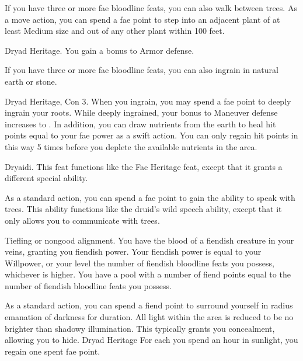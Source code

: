 If you have three or more fae bloodline feats, you can also walk between trees. As a move action, you can spend a fae point to step into an adjacent plant of at least Medium size and out of any other plant within 100 feet.

\featpre Dryad Heritage.
\featben You gain a  bonus to Armor defense.

If you have three or more fae bloodline feats, you can also ingrain in natural earth or stone.

\featpres Dryad Heritage, Con 3.
\featben When you ingrain, you may spend a fae point to deeply ingrain your roots. While deeply ingrained, your bonus to Maneuver defense increases to . In addition, you can draw nutrients from the earth to heal hit points equal to your fae power as a swift action. You can only regain hit points in this way 5 times before you deplete the available nutrients in the area. 

\featpre Dryaidi.
\featben This feat functions like the Fae Heritage feat, except that it grants a different special ability.

As a standard action, you can spend a fae point to gain the ability to speak with trees. This ability functions like the druid's wild speech ability, except that it only allows you to communicate with trees.

\featpre Tiefling or nongood alignment.
\featben You have the blood of a fiendish creature in your veins, granting you fiendish power.
Your fiendish power is equal to your Willpower, or your level \add the number of fiendish bloodline feats you possess, whichever is higher.
You have a pool with a number of fiend points equal to the number of fiendish bloodline feats you possess.

As a standard action, you can spend a fiend point to surround yourself in \areamed radius emanation of darkness for \durshort duration.
All light within the area is reduced to be no brighter than shadowy illumination.
This typically grants you concealment, allowing you to hide.
\featpre Dryad Heritage
\featben For each you spend an hour in sunlight, you regain one spent fae point.
